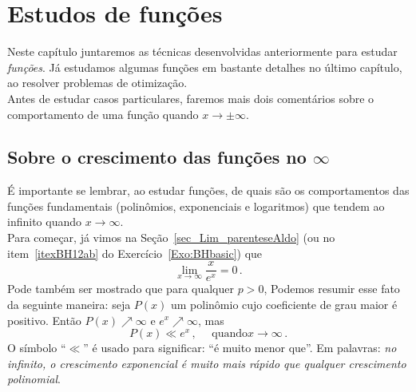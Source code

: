 

\chapter{Estudos de funções}\label{Cap:Estudos}

\ifdefined\updateans
\fi

Neste capítulo juntaremos as técnicas desenvolvidas anteriormente
para estudar \emph{funções}.
Já estudamos algumas funções em bastante detalhes no último capítulo, 
ao resolver problemas de otimização.\\

Antes de estudar casos particulares, faremos mais dois comentários
sobre o comportamento
de uma função quando $x\to \pm \infty$.


\section{Sobre o crescimento das funções no $\infty$}

É importante se lembrar, ao estudar funções, de quais são os
comportamentos das funções fundamentais  
(polinômios, exponenciais e logaritmos) que tendem ao infinito
quando $x\to \infty$.\\

Para começar, 
já vimos na Seção~\ref{sec_Lim_parenteseAldo}
(ou no item~\eqref{itexBH12ab} do Exercício~\ref{Exo:BHbasic})
que 
$$\lim_{x\to \infty}\frac{x}{e^{x}}=0\,.$$
Pode também ser mostrado que para qualquer $p>0$,
Podemos resumir esse fato da seguinte maneira: seja
$P(x)$ um polinômio cujo coeficiente de grau maior é positivo.
Então $P(x)\nearrow \infty$ e $e^x\nearrow \infty$, mas 
$$\boxed{P(x)\ll e^x\,,\quad\text{ quando
}x\to \infty\,.}$$
O símbolo ``$\ll$'' é usado para significar: ``é muito menor que''.
Em palavras: \emph{no infinito, o crescimento exponencial é
muito mais rápido que qualquer crescimento polinomial}.\\

